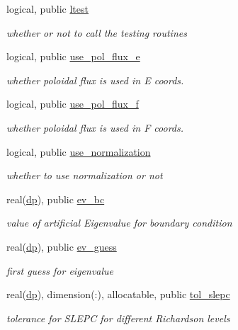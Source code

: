 \begin{DoxyCompactItemize}
logical, public \hyperlink{namespacenum__vars_a06597cae984d53aec80c150fc13d3e7f}{ltest}
\begin{DoxyCompactList}\small\item\em whether or not to call the testing routines \end{DoxyCompactList}\item 
logical, public \hyperlink{namespacenum__vars_adedd3c1e77cfdf75dac84e43ee54497a}{use\+\_\+pol\+\_\+flux\+\_\+e}
\begin{DoxyCompactList}\small\item\em whether poloidal flux is used in E coords. \end{DoxyCompactList}\item 
logical, public \hyperlink{namespacenum__vars_ae21ec57b791e369c3558c0eb3da1555b}{use\+\_\+pol\+\_\+flux\+\_\+f}
\begin{DoxyCompactList}\small\item\em whether poloidal flux is used in F coords. \end{DoxyCompactList}\item 
logical, public \hyperlink{namespacenum__vars_a585ed16ea01f299cd764690f057af2c6}{use\+\_\+normalization}
\begin{DoxyCompactList}\small\item\em whether to use normalization or not \end{DoxyCompactList}\item 
real(\hyperlink{namespacenum__vars_a03802aa2bd86439d7a9370836fabf3f2}{dp}), public \hyperlink{namespacenum__vars_a4efc3cca2482236a18b8927bca8361c2}{ev\+\_\+bc}
\begin{DoxyCompactList}\small\item\em value of artificial Eigenvalue for boundary condition \end{DoxyCompactList}\item 
real(\hyperlink{namespacenum__vars_a03802aa2bd86439d7a9370836fabf3f2}{dp}), public \hyperlink{namespacenum__vars_a4c19f47e50c92bfd52985761500a999e}{ev\+\_\+guess}
\begin{DoxyCompactList}\small\item\em first guess for eigenvalue \end{DoxyCompactList}\item 
real(\hyperlink{namespacenum__vars_a03802aa2bd86439d7a9370836fabf3f2}{dp}), dimension(\+:), allocatable, public \hyperlink{namespacenum__vars_acbfccf15a8af9fce37f9cb3f2c85be76}{tol\+\_\+slepc}
\begin{DoxyCompactList}\small\item\em tolerance for S\+L\+E\+PC for different Richardson levels \end{DoxyCompactList}\item 

\end{DoxyCompactItemize}
